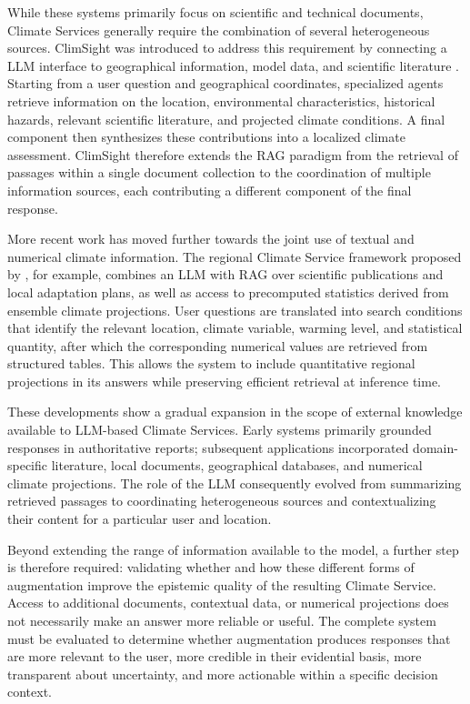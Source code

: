 While these systems primarily focus on scientific and technical documents, Climate Services generally require the combination of several heterogeneous sources. ClimSight was introduced to address this requirement by connecting a LLM interface to geographical information, model data, and scientific literature \citep{koldunov_local_2024,kuznetsov_transforming_2025}. Starting from a user question and geographical coordinates, specialized agents retrieve information on the location, environmental characteristics, historical hazards, relevant scientific literature, and projected climate conditions. A final component then synthesizes these contributions into a localized climate assessment. ClimSight therefore extends the RAG paradigm from the retrieval of passages within a single document collection to the coordination of multiple information sources, each contributing a different component of the final response.

More recent work has moved further towards the joint use of textual and numerical climate information. The regional Climate Service framework proposed by \citet{matsuoka_llm_2026}, for example, combines an LLM with RAG over scientific publications and local adaptation plans, as well as access to precomputed statistics derived from ensemble climate projections. User questions are translated into search conditions that identify the relevant location, climate variable, warming level, and statistical quantity, after which the corresponding numerical values are retrieved from structured tables. This allows the system to include quantitative regional projections in its answers while preserving efficient retrieval at inference time.

These developments show a gradual expansion in the scope of external knowledge available to LLM-based Climate Services. Early systems primarily grounded responses in authoritative reports; subsequent applications incorporated domain-specific literature, local documents, geographical databases, and numerical climate projections. The role of the LLM consequently evolved from summarizing retrieved passages to coordinating heterogeneous sources and contextualizing their content for a particular user and location.

Beyond extending the range of information available to the model, a further step is therefore required: validating whether and how these different forms of augmentation improve the epistemic quality of the resulting Climate Service. Access to additional documents, contextual data, or numerical projections does not necessarily make an answer more reliable or useful. The complete system must be evaluated to determine whether augmentation produces responses that are more relevant to the user, more credible in their evidential basis, more transparent about uncertainty, and more actionable within a specific decision context.

